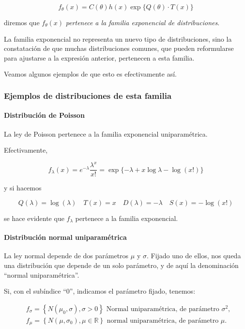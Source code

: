 \documentclass[
]{article}
\begin{document}
\[f_{\theta}(x)=C(\theta) h(x) \exp\{Q(\theta) \cdot T(x)\}\]

diremos que \(f_{\theta}(x)\) \emph{pertenece a la familia exponencial de distribuciones}.

La familia exponencial no representa un nuevo tipo de distribuciones, sino la constatación de que muchas distribuciones comunes, que pueden reformularse para ajustarse a la expresión anterior, pertenecen a esta familia.

Veamos algunos ejemplos de que esto es efectivamente así.

\subsubsection{Ejemplos de distribuciones de esta familia}\label{ejemplos-de-distribuciones-de-esta-familia}

\paragraph{Distribución de Poisson}\label{distribuciuxf3n-de-poisson}

La ley de Poisson pertenece a la familia exponencial uniparamétrica.

Efectivamente,

\[f_{\lambda}(x)=e^{-\lambda} \frac{\lambda^{x}}{x!}=\exp\{-\lambda+x \log \lambda-\log(x!)\}\]

y si hacemos

\[Q(\lambda)=\log(\lambda) \quad T(x)=x \quad D(\lambda)=-\lambda \quad S(x)=-\log(x!)\]

se hace evidente que \(f_{\lambda}\) pertenece a la familia exponencial.

\paragraph{Distribución normal uniparamétrica}\label{distribuciuxf3n-normal-uniparamuxe9trica}

La ley normal depende de dos parámetros \(\mu\) y \(\sigma\). Fijado uno de ellos, nos queda una distribución que depende de un solo parámetro, y de aquí la denominación ``normal uniparamétrica''.

Si, con el subíndice ``0'', indicamos el parámetro fijado, tenemos:

\[
\begin{aligned}
&f_{\sigma}=\left\{N\left(\mu_0, \sigma\right), \sigma>0\right\} \text{ Normal uniparamétrica, de parámetro } \sigma^2, \\
&f_{\mu}=\left\{N\left(\mu, \sigma_0\right), \mu \in \mathbb{R}\right\} \text{ normal uniparamétrica, de parámetro } \mu.
\end{aligned}
\]
\end{document}
